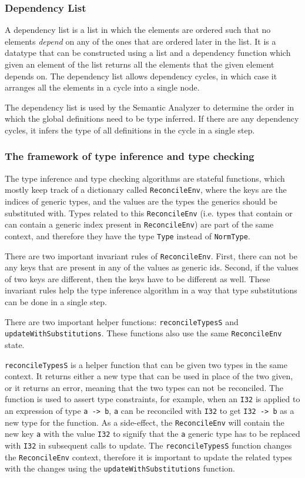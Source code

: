 \documentclass[12pt]{article}
\begin{document}
\subsubsection{Dependency List}

A dependency list is a list in which the elements are ordered such that no
elements \emph{depend} on any of the ones that are ordered later in the list. It
is a datatype that can be constructed using a list and a dependency function
which given an element of the list returns all the elements that the given
element depends on. The dependency list allows dependency cycles, in which case
it arranges all the elements in a cycle into a single node.

The dependency list is used by the Semantic Analyzer to determine the order in
which the global definitions need to be type inferred. If there are any
dependency cycles, it infers the type of all definitions in the cycle in a
single step.

\subsubsection{The framework of type inference and type checking}

The type inference and type checking algorithms are stateful functions, which
mostly keep track of a dictionary called \verb$ReconcileEnv$, where the keys are
the indices of generic types, and the values are the types the generics should
be substituted with. Types related to this \verb$ReconcileEnv$ (i.e. types that
contain or can contain a generic index present in \verb$ReconcileEnv$) are part
of the same context, and therefore they have the type \verb$Type$ instead of
\verb$NormType$. 

There are two important invariant rules of \verb$ReconcileEnv$. First, there can
not be any keys that are present in any of the values as generic ids. Second,
if the values of two keys are different, then the keys have to be different as
well. These invariant rules help the type inference algorithm in a way that type
substitutions can be done in a single step.

There are two important helper functions:
\verb$reconcileTypesS$ and \\\verb$updateWithSubstitutions$. These functions
also use the same \verb$ReconcileEnv$ state.

\verb$reconcileTypesS$ is a helper function that can be given two types in the
same context. It returns either a new type that can be used in place of the two
given, or it returns an error, meaning that the two types can not be reconciled.
The function is used to assert type constraints, for example, when an \verb$I32$
is applied to an expression of type \verb$a -> b$, \verb$a$ can be reconciled
with \verb$I32$ to get \verb$I32 -> b$ as a new type for the function. As a
side-effect, the \verb$ReconcileEnv$ will contain the new key \verb$a$ with the
value \verb$I32$ to signify that the \verb$a$ generic type has to be replaced
with \verb$I32$ in subsequent calls to update. The \verb$reconcileTypesS$
function changes the \verb$ReconcileEnv$ context, therefore it is important to
update the related types with the changes using the
\verb$updateWithSubstitutions$ function.
\end{document}
